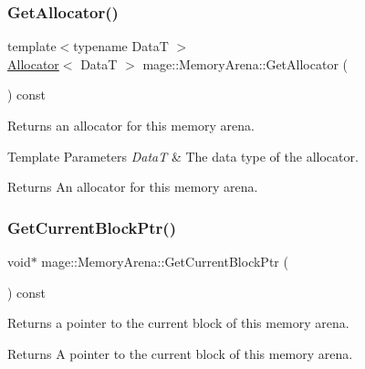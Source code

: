\subsubsection{\texorpdfstring{Get\+Allocator()}{GetAllocator()}}
{\footnotesize\ttfamily template$<$typename DataT $>$ \\
\hyperlink{structmage_1_1_memory_arena_1_1_allocator}{Allocator}$<$ DataT $>$ mage\+::\+Memory\+Arena\+::\+Get\+Allocator (\begin{DoxyParamCaption}{ }\end{DoxyParamCaption}) const\hspace{0.3cm}{\ttfamily [noexcept]}}

Returns an allocator for this memory arena.


\begin{DoxyTemplParams}{Template Parameters}
{\em DataT} & The data type of the allocator. \\
\hline
\end{DoxyTemplParams}
\begin{DoxyReturn}{Returns}
An allocator for this memory arena. 
\end{DoxyReturn}
\hypertarget{classmage_1_1_memory_arena_a7bdbc9da32c1f8d49ce5d2f153870284}{}\label{classmage_1_1_memory_arena_a7bdbc9da32c1f8d49ce5d2f153870284} 
\subsubsection{\texorpdfstring{Get\+Current\+Block\+Ptr()}{GetCurrentBlockPtr()}}
{\footnotesize\ttfamily void$\ast$ mage\+::\+Memory\+Arena\+::\+Get\+Current\+Block\+Ptr (\begin{DoxyParamCaption}{ }\end{DoxyParamCaption}) const\hspace{0.3cm}{\ttfamily [noexcept]}}

Returns a pointer to the current block of this memory arena.

\begin{DoxyReturn}{Returns}
A pointer to the current block of this memory arena. 
\end{DoxyReturn}
\hypertarget{classmage_1_1_memory_arena_a0b41d6901c3519f046cd551931f72c1b}{}\label{classmage_1_1_memory_arena_a0b41d6901c3519f046cd551931f72c1b} 
